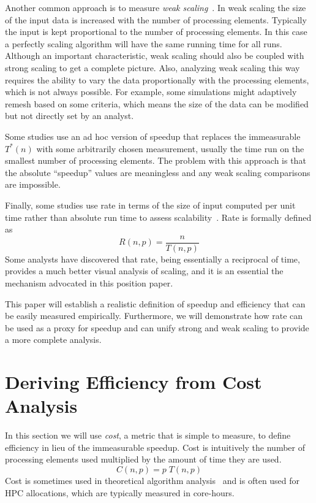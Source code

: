 \documentclass[conference]{IEEEtran}
\newcommand*{\lcite}[1]{~\cite{#1}}
\newcommand*{\keyterm}[1]{\emph{#1}}
\begin{document}
Another common approach is to measure \keyterm{weak scaling}\lcite{Kaminsky2014}.
In weak scaling the size of the input data is increased with the number of
processing elements. Typically the input is kept proportional to the number
of processing elements. In this case a perfectly scaling algorithm will
have the same running time for all runs. Although an important
characteristic, weak scaling should also be coupled with strong scaling to
get a complete picture. Also, analyzing weak scaling this way requires the
ability to vary the data proportionally with the processing elements, which
is not always possible.  For example, some simulations might adaptively
remesh based on some criteria, which means the size of the data can be
modified but not directly set by an analyst.

Some studies use an ad hoc version of speedup that replaces the
immeasurable $T^*(n)$ with some arbitrarily chosen measurement, usually the
time run on the smallest number of processing elements. The problem with
this approach is that the absolute ``speedup'' values are meaningless and
any weak scaling comparisons are impossible.

Finally, some studies use rate in terms of the size of input computed per
unit time rather than absolute run time to assess
scalability\lcite{Kaminsky2014}. Rate is formally defined as
\begin{equation}
  R(n,p) = \frac{n}{T(n,p)}
  \label{eq:Rate}
\end{equation}
Some analysts have discovered that rate, being essentially a reciprocal of
time, provides a much better visual analysis of scaling, and it is
an essential the mechanism advocated in this position paper.

This paper will establish a realistic definition of speedup and efficiency
that can be easily measured empirically. Furthermore, we will demonstrate
how rate can be used as a proxy for speedup and can unify strong and weak
scaling to provide a more complete analysis.


\section{Deriving Efficiency from Cost Analysis}
\label{sec:CostAnalysis}

\noindent
In this section we will use \keyterm{cost}, a metric that is simple to
measure, to define efficiency in lieu of the immeasurable speedup. Cost is
intuitively the number of processing elements used multiplied by the amount
of time they are used.
\begin{equation}
  C(n,p) = p \; T(n,p)
  \label{eq:Cost}
\end{equation}
Cost is sometimes used in theoretical algorithm analysis\lcite{JaJa1992}
and is often used for HPC allocations, which are typically measured in
core-hours.
\end{document}

